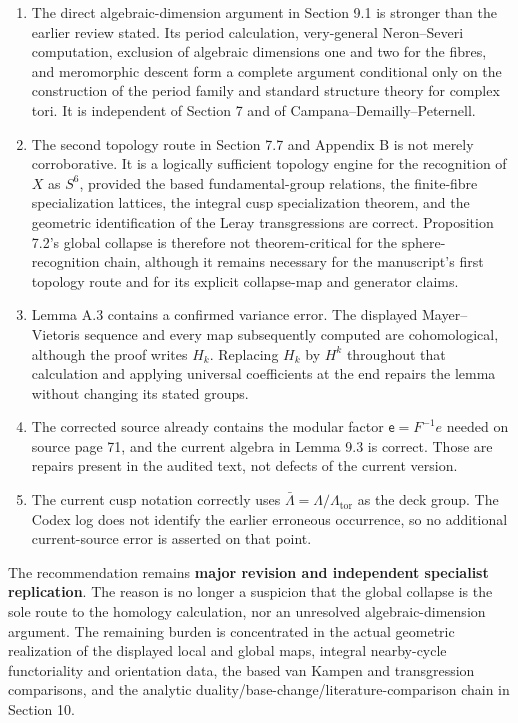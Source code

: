 \documentclass[
  10pt,
  letterpaper,
]{article}
\providecommand{\tightlist}{%
  \setlength{\itemsep}{0pt}\setlength{\parskip}{0pt}}
\begin{document}
\begin{enumerate}
\def\labelenumi{\arabic{enumi}.}
\tightlist
\item
  The direct algebraic-dimension argument in Section 9.1 is stronger
  than the earlier review stated. Its period calculation, very-general
  Neron--Severi computation, exclusion of algebraic dimensions one and
  two for the fibres, and meromorphic descent form a complete argument
  conditional only on the construction of the period family and standard
  structure theory for complex tori. It is independent of Section 7 and
  of Campana--Demailly--Peternell.
\item
  The second topology route in Section 7.7 and Appendix B is not merely
  corroborative. It is a logically sufficient topology engine for the
  recognition of \(X\) as \(S^6\), provided the based fundamental-group
  relations, the finite-fibre specialization lattices, the integral cusp
  specialization theorem, and the geometric identification of the Leray
  transgressions are correct. Proposition 7.2's global collapse is
  therefore not theorem-critical for the sphere-recognition chain,
  although it remains necessary for the manuscript's first topology
  route and for its explicit collapse-map and generator claims.
\item
  Lemma A.3 contains a confirmed variance error. The displayed
  Mayer--Vietoris sequence and every map subsequently computed are
  cohomological, although the proof writes \(H_k\). Replacing \(H_k\) by
  \(H^k\) throughout that calculation and applying universal
  coefficients at the end repairs the lemma without changing its stated
  groups.
\item
  The corrected source already contains the modular factor
  \(\mathsf e=F^{-1}e\) needed on source page 71, and the current
  algebra in Lemma 9.3 is correct. Those are repairs present in the
  audited text, not defects of the current version.
\item
  The current cusp notation correctly uses
  \(\bar\Lambda=\Lambda/\Lambda_{\mathrm{tor}}\) as the deck group. The
  Codex log does not identify the earlier erroneous occurrence, so no
  additional current-source error is asserted on that point.
\end{enumerate}

The recommendation remains \textbf{major revision and independent
specialist replication}. The reason is no longer a suspicion that the
global collapse is the sole route to the homology calculation, nor an
unresolved algebraic-dimension argument. The remaining burden is
concentrated in the actual geometric realization of the displayed local
and global maps, integral nearby-cycle functoriality and orientation
data, the based van Kampen and transgression comparisons, and the
analytic duality/base-change/literature-comparison chain in Section 10.
\end{document}
